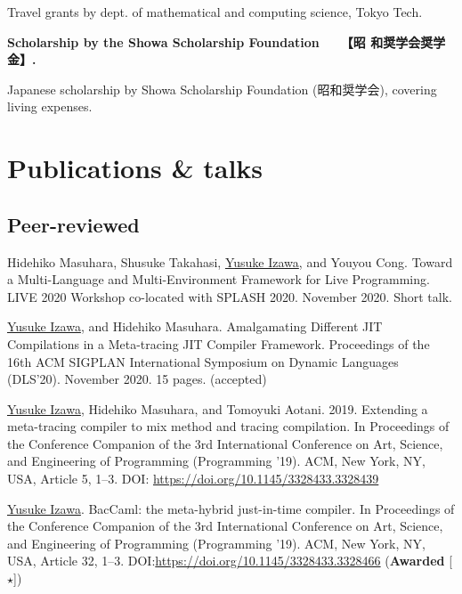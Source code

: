 \documentclass[11pt]{article} %
\newcommand{\YusukeIzawa}{\underline{Yusuke Izawa}}
\newcommand{\伊澤侑祐}{\underline{伊澤侑祐}}
\newcommand{\jit}{\textsc{JIT} }
\begin{document}
Travel grants by dept. of mathematical and computing science, Tokyo Tech.

\medskip


 \textbf{Scholarship by the Showa Scholarship Foundation~~~【昭
  和奨学会奨学金】.}

Japanese scholarship by Showa Scholarship Foundation (昭和奨学会), covering
living expenses.

\medskip


\section*{Publications \& talks}

\subsection*{Peer-reviewed}

 Hidehiko Masuhara, Shusuke Takahasi, \YusukeIzawa, and Youyou
Cong. Toward a Multi-Language and Multi-Environment Framework for Live Programming.
LIVE 2020 Workshop co-located with SPLASH 2020. November 2020. Short talk.
\medskip

 \YusukeIzawa, and Hidehiko Masuhara. Amalgamating Different \jit
Compilations in a Meta-tracing \jit Compiler Framework. Proceedings of the 16th ACM
SIGPLAN International Symposium on Dynamic Languages (DLS'20). November 2020. 15
pages. (accepted)
\medskip

 \YusukeIzawa, Hidehiko Masuhara, and Tomoyuki
Aotani. 2019. Extending a meta-tracing compiler to mix method and tracing
compilation. In Proceedings of the Conference Companion of the 3rd International
Conference on Art, Science, and Engineering of Programming (Programming
’19). ACM, New York, NY, USA, Article 5, 1–3. DOI:
\url{https://doi.org/10.1145/3328433.3328439}
\medskip

 \YusukeIzawa. BacCaml: the meta-hybrid just-in-time compiler. In
Proceedings of the Conference Companion of the 3rd International Conference on
Art, Science, and Engineering of Programming (Programming ’19). ACM, New York,
NY, USA, Article 32, 1–3. DOI:\url{https://doi.org/10.1145/3328433.3328466}
(\textbf{Awarded} [$\star$])
\medskip
\end{document}
